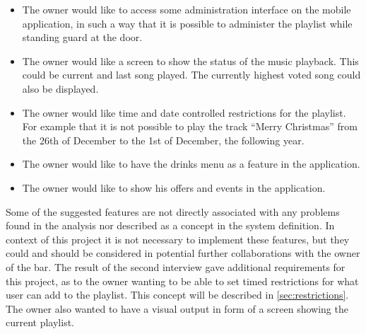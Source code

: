 \begin{itemize}
    \item{The owner would like to access some administration interface on the mobile application, in such a way that it is possible to administer the playlist while standing guard at the door.}
    \item{The owner would like a screen to show the status of the music playback. This could be current and last song played. The currently highest voted song could also be displayed.}
    \item{The owner would like time and date controlled restrictions for the playlist. For example that it is not possible to play the track \enquote{Merry Christmas} from the 26th of December to the 1st of December, the following year.}
    \item{The owner would like to have the drinks menu as a feature in the application.}
    \item{The owner would like to show his offers and events in the application.}
\end{itemize}

Some of the suggested features are not directly associated with any
problems found in the analysis nor described as a concept in the
system definition. In context of this project it is not
necessary to implement these features, but they could and should be
considered in potential further collaborations with the owner of the
bar. The result of the second interview gave additional requirements
for this project, as to the owner wanting to be able to set timed
restrictions for what user can add to the playlist. This concept will
be described in \cref{sec:restrictions}. The owner also wanted to have
a visual output in form of a screen showing the current playlist.
